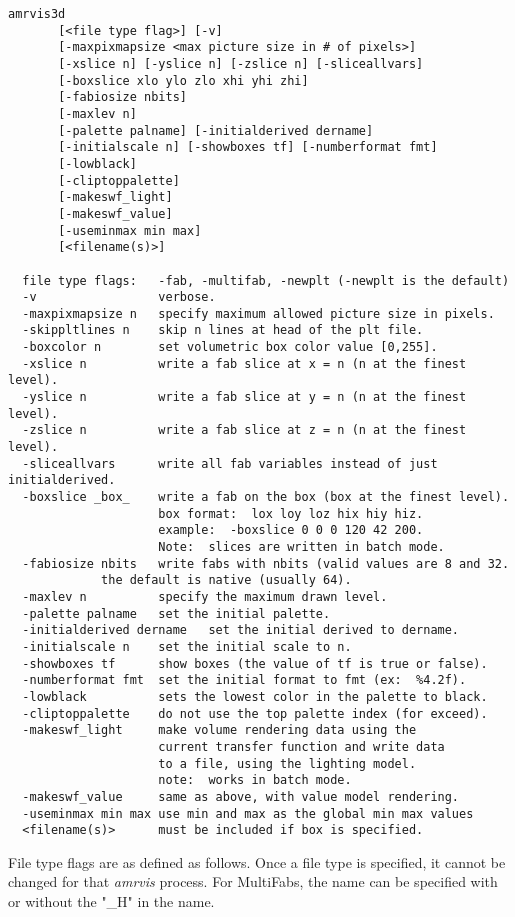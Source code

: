 \begin{verbatim}
amrvis3d
       [<file type flag>] [-v]
       [-maxpixmapsize <max picture size in # of pixels>]
       [-xslice n] [-yslice n] [-zslice n] [-sliceallvars]
       [-boxslice xlo ylo zlo xhi yhi zhi]
       [-fabiosize nbits]
       [-maxlev n]
       [-palette palname] [-initialderived dername]
       [-initialscale n] [-showboxes tf] [-numberformat fmt]
       [-lowblack]
       [-cliptoppalette]
       [-makeswf_light]
       [-makeswf_value]
       [-useminmax min max]
       [<filename(s)>]

  file type flags:   -fab, -multifab, -newplt (-newplt is the default)
  -v                 verbose.
  -maxpixmapsize n   specify maximum allowed picture size in pixels.
  -skippltlines n    skip n lines at head of the plt file.
  -boxcolor n        set volumetric box color value [0,255].
  -xslice n          write a fab slice at x = n (n at the finest level).
  -yslice n          write a fab slice at y = n (n at the finest level).
  -zslice n          write a fab slice at z = n (n at the finest level).
  -sliceallvars      write all fab variables instead of just initialderived.
  -boxslice _box_    write a fab on the box (box at the finest level).
                     box format:  lox loy loz hix hiy hiz.
                     example:  -boxslice 0 0 0 120 42 200.
                     Note:  slices are written in batch mode.
  -fabiosize nbits   write fabs with nbits (valid values are 8 and 32.
		     the default is native (usually 64).
  -maxlev n          specify the maximum drawn level.
  -palette palname   set the initial palette.
  -initialderived dername   set the initial derived to dername.
  -initialscale n    set the initial scale to n.
  -showboxes tf      show boxes (the value of tf is true or false).
  -numberformat fmt  set the initial format to fmt (ex:  %4.2f).
  -lowblack          sets the lowest color in the palette to black.
  -cliptoppalette    do not use the top palette index (for exceed).
  -makeswf_light     make volume rendering data using the
                     current transfer function and write data
                     to a file, using the lighting model.
                     note:  works in batch mode.
  -makeswf_value     same as above, with value model rendering.
  -useminmax min max use min and max as the global min max values
  <filename(s)>      must be included if box is specified.
\end{verbatim}


File type flags are as defined as follows.  Once a file type is specified,
it cannot be changed for that {\em amrvis} process.  For MultiFabs,
the name can be specified with or without the "\_H" in the name.

